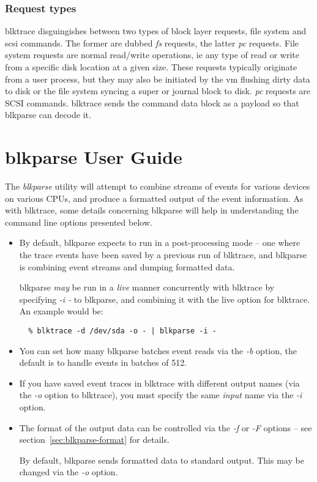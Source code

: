 \documentclass{article}
\begin{document}
\subsubsection{\label{sec:request-types}Request types}
blktrace disguingishes between two types of block layer requests,
file system and scsi commands. The former are dubbed \emph{fs}
requests, the latter \emph{pc} requests. File system requests are
normal read/write operations, ie any type of read or write from a
specific disk location at a given size. These requests typically
originate from a user process, but they may also be initiated by
the vm flushing dirty data to disk or the file system syncing
a super or journal block to disk. \emph{pc} requests are SCSI
commands. blktrace sends the command data block as a payload
so that blkparse can decode it.

\newpage\section{\label{sec:blkparse-ug}blkparse User Guide}

The \emph{blkparse} utility will attempt to combine streams of events
for various devices on various CPUs, and produce a formatted output of
the event information. As with blktrace, some details concerning blkparse
will help in understanding the command line options presented below.

\begin{itemize}
  \item By default, blkparse expects to run in a post-processing mode
  -- one where the trace events have been saved by a previous run
  of blktrace, and blkparse is combining event streams and dumping
  formatted data. 

  blkparse \emph{may} be run in a \emph{live} manner concurrently with
  blktrace by specifying \emph{-i -} to blkparse, and combining it with
  the live option for blktrace. An example would be:

  \begin{verbatim}
  % blktrace -d /dev/sda -o - | blkparse -i -
  \end{verbatim}

  \item You can set how many blkparse batches event reads via the
  \emph{-b} option, the default is to handle events in batches of 512.

  \item If you have saved event traces in blktrace with different output
  names (via the \emph{-o} option to blktrace), you must specify the
  same \emph{input} name via the \emph{-i} option.

  \item The format of the output data can be controlled via the \emph{-f}
  or \emph{-F} options -- see section~\ref{sec:blkparse-format} for details.

  By default, blkparse sends formatted data to standard output. This
  may be changed via the \emph{-o} option.

\end{itemize}
\end{document}
